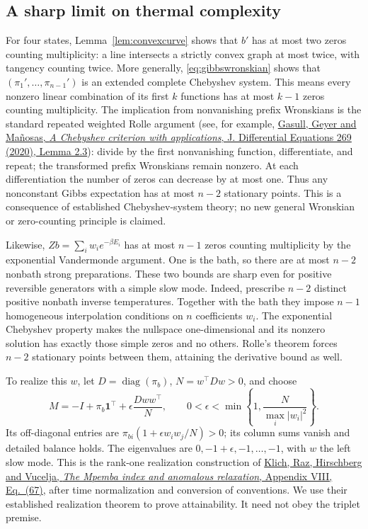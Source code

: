 \documentclass[11pt]{article}
\begin{document}
\subsection{A sharp limit on thermal complexity}
For four states, Lemma~\ref{lem:convexcurve} shows that $b'$ has at most two
zeros counting multiplicity: a line intersects a strictly convex graph at
most twice, with tangency counting twice. More generally,
\eqref{eq:gibbswronskian} shows that $(\pi_1',\ldots,\pi_{n-1}')$ is an
extended complete Chebyshev system. This means every nonzero linear combination
of its first $k$ functions has at most $k-1$ zeros counting multiplicity.
The implication from nonvanishing prefix Wronskians is the standard repeated
weighted Rolle argument (see, for example,
\href{https://repository.tudelft.nl/file/File_ce2c559d-93ee-46e3-8128-227b977215ac}{Gasull, Geyer and Ma\~nosas,
\emph{A Chebyshev criterion with applications}, J. Differential Equations 269
(2020), Lemma 2.3}): divide by the first nonvanishing function,
differentiate, and repeat; the transformed prefix Wronskians remain nonzero.
At each differentiation the number of zeros can decrease by at most one.
Thus any nonconstant Gibbs expectation has at most $n-2$ stationary points.
This is a consequence of established Chebyshev-system theory; no new general
Wronskian or zero-counting principle is claimed.

Likewise, $Zb=\sum_iw_i e^{-\beta E_i}$ has at most $n-1$ zeros counting
multiplicity by the exponential Vandermonde argument. One is the bath, so
there are at most $n-2$ nonbath strong preparations. These two bounds are
sharp even for positive reversible generators with a simple slow mode.
Indeed, prescribe $n-2$ distinct positive nonbath inverse temperatures.
Together with the bath they impose $n-1$ homogeneous interpolation conditions
on $n$ coefficients $w_i$. The exponential Chebyshev property makes the
nullspace one-dimensional and its nonzero solution has exactly those simple
zeros and no others. Rolle's theorem forces $n-2$ stationary points between
them, attaining the derivative bound as well.

To realize this $w$, let $D=\operatorname{diag}(\pi_b)$,
$N=w^\top Dw>0$, and choose
\begin{equation}\label{eq:rankonerealization}
M=-I+\pi_b\mathbf1^\top+\epsilon\frac{Dw w^\top}{N},\qquad
0<\epsilon<\min\left\{1,\frac{N}{\max_i|w_i|^2}\right\}.
\end{equation}
Its off-diagonal entries are $\pi_{bi}(1+\epsilon w_iw_j/N)>0$;
its column sums vanish and detailed balance holds. The eigenvalues are
$0,-1+\epsilon,-1,\ldots,-1$, with $w$ the left slow mode. This is the rank-one realization construction of
\href{https://arxiv.org/abs/1711.05829v3}{Klich, Raz, Hirschberg and Vucelja,
\emph{The Mpemba index and anomalous relaxation}, Appendix VIII, Eq.~(67)},
after time normalization and conversion of conventions. We use their
established realization theorem to prove attainability. It need not obey the triplet premise.
\end{document}
